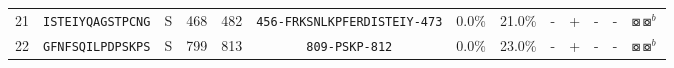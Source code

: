 \begin{tabular}{rcccccccccccc}
21 &  \texttt{ISTEIYQAGSTPCNG} &       S &    468 &   482 &  \texttt{{\scriptsize 456-}FRKSNLKPFERDISTEIY{\scriptsize -473}} &                           0.0\% &                           21.0\% &          - &           + &          - &           - &                                                                           $ \boxcircle \boxcircle^b $ \\
22 &  \texttt{GFNFSQILPDPSKPS} &       S &    799 &   813 &                \texttt{{\scriptsize 809-}PSKP{\scriptsize -812}} &                           0.0\% &                           23.0\% &          - &           + &          - &           - &                                                                           $ \boxcircle \boxcircle^b $ \\
\bottomrule
\end{tabular}
